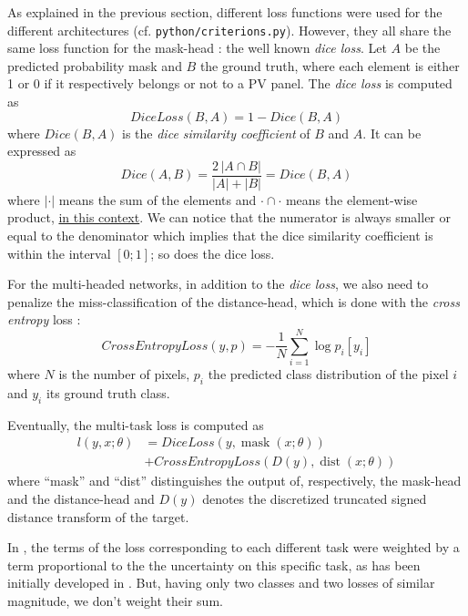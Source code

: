 \documentclass[twocolumn,superscriptaddress,aps,nofootinbib]{revtex4-1}
\begin{document}
As explained in the previous section, different loss functions were used for the different architectures (cf. \texttt{python/criterions.py}). However, they all share the same loss function for the mask-head : the well known \emph{dice loss}.
Let $A$ be the predicted probability mask and $B$ the ground truth, where each element is either 1 or 0 if it respectively belongs or not to a PV panel. The \emph{dice loss} is computed as
\begin{equation}
    DiceLoss(B, A) = 1 - Dice(B, A)
\end{equation}
where $Dice(B, A)$ is the \emph{dice similarity coefficient} of $B$ and $A$. It can be expressed as
\begin{equation}
    Dice(A, B) = \frac{2 \, |A \cap B|}{|A| + |B|} = Dice(B, A)
\end{equation}
where $|\cdot|$ means the sum of the elements and $\cdot \cap \cdot$ means the element-wise product, \underline{in this context}. We can notice that the numerator is always smaller or equal to the denominator which implies that the dice similarity coefficient is within the interval $[0; 1]$; so does the dice loss.

For the multi-headed networks, in addition to the \emph{dice loss}, we also need to penalize the miss-classification of the distance-head, which is done with the \emph{cross entropy} loss :
\begin{equation}
    CrossEntropyLoss(y, p) = - \frac{1}{N} \sum_{i=1}^N \log p_i[y_i]
\end{equation}
where $N$ is the number of pixels, $p_i$ the predicted class distribution of the pixel $i$ and $y_i$ its ground truth class.

Eventually, the multi-task loss is computed as
\begin{equation}
    \begin{aligned}
        l(y, x ; \theta) & = DiceLoss(y, \operatorname{mask}(x ; \theta)) \\
                         & + CrossEntropyLoss(D(y), \operatorname{dist}(x ; \theta))
    \end{aligned}
\end{equation}
where \enquote{mask} and \enquote{dist} distinguishes the output of, respectively, the mask-head and the distance-head and $D(y)$ denotes the discretized truncated signed distance transform of the target.

In \cite{bischke2019multi}, the terms of the loss corresponding to each different task were weighted by a term proportional to the the uncertainty on this specific task, as has been initially developed in \cite{kendall2018multi}. But, having only two classes and two losses of similar magnitude, we don't weight their sum.
\end{document}
